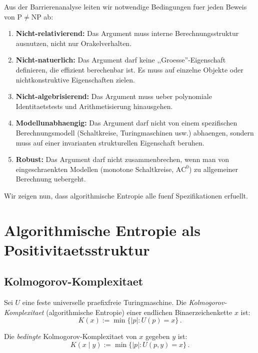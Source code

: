\documentclass[aps,prd,twocolumn,superscriptaddress,nofootinbib]{revtex4-2}
\theoremstyle{definition}
\theoremstyle{remark}
\newcommand{\NP}{\mathrm{NP}}
\newcommand{\PP}{\mathrm{P}}
\begin{document}
Aus der Barrierenanalyse leiten wir notwendige Bedingungen fuer jeden Beweis von $\PP \neq \NP$ ab:

\begin{enumerate}
\item[\textbf{(S1)}] \textbf{Nicht-relativierend:} Das Argument muss interne Berechnungsstruktur ausnutzen, nicht nur Orakelverhalten.
\item[\textbf{(S2)}] \textbf{Nicht-natuerlich:} Das Argument darf keine ,,Groesse''-Eigenschaft definieren, die effizient berechenbar ist. Es muss auf einzelne Objekte oder nichtkonstruktive Eigenschaften zielen.
\item[\textbf{(S3)}] \textbf{Nicht-algebrisierend:} Das Argument muss ueber polynomiale Identitaetstests und Arithmetisierung hinausgehen.
\item[\textbf{(S4)}] \textbf{Modellunabhaengig:} Das Argument darf nicht von einem spezifischen Berechnungsmodell (Schaltkreise, Turingmaschinen usw.) abhaengen, sondern muss auf einer invarianten strukturellen Eigenschaft beruhen.
\item[\textbf{(S5)}] \textbf{Robust:} Das Argument darf nicht zusammenbrechen, wenn man von eingeschraenkten Modellen (monotone Schaltkreise, $\mathrm{AC}^0$) zu allgemeiner Berechnung uebergeht.
\end{enumerate}

Wir zeigen nun, dass algorithmische Entropie alle fuenf Spezifikationen erfuellt.


\section{Algorithmische Entropie als Positivitaetsstruktur}
\label{sec:entropy}

\subsection{Kolmogorov-Komplexitaet}

Sei $U$ eine feste universelle praefixfreie Turingmaschine. Die \textit{Kolmogorov-Komplexitaet} (algorithmische Entropie) einer endlichen Binaerzeichenkette $x$ ist:
\begin{equation}
K(x) := \min\{|p| : U(p) = x\}\,.
\label{eq:kolmogorov}
\end{equation}

Die \textit{bedingte} Kolmogorov-Komplexitaet von $x$ gegeben $y$ ist:
\begin{equation}
K(x \mid y) := \min\{|p| : U(p, y) = x\}\,.
\label{eq:conditional_K}
\end{equation}
\end{document}
